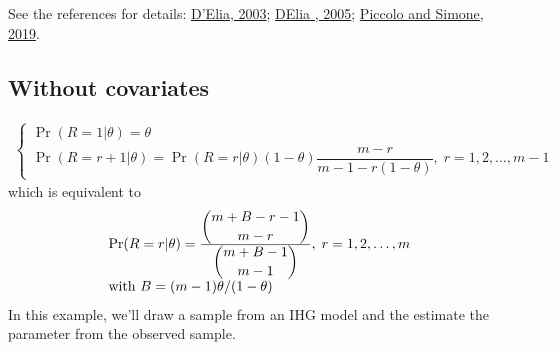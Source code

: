 \documentclass[letterpaper,10pt,english]{sphinxmanual}
\begin{document}
\sphinxAtStartPar
See the references for details: \hyperlink{cite.references:id17}{D’Elia, 2003}; \hyperlink{cite.references:id18}{D\textquotesingle{}Elia , 2005};
\hyperlink{cite.references:id3}{Piccolo and Simone, 2019}.


\subsection{Without covariates}
\label{\detokenize{manual:ihg-without-covariates}}\label{\detokenize{manual:id38}}
\sphinxAtStartPar
{}
\begin{equation*}
\begin{split}\left\{
\begin{array}{l}
    \Pr(R=1|\theta) = \theta
    \\
    \Pr(R=r+1|\theta) = \Pr(R=r|\theta)(1-\theta)\dfrac{m-r}{m-1-r(1-\theta)},\; r= 1,2, \ldots, m-1
\end{array}
\right.\end{split}
\end{equation*}
\sphinxAtStartPar
which is equivalent to
\begin{equation*}
\begin{split}\begin{array}{l}
\Pr(R=r|\theta) = \frac{ \dbinom{m+B-r-1}{m-r} }{ \dbinom{m+B-1}{m-1} },\; r= 1,2, \ldots, m
\\
\textrm{with } B = (m-1)\theta / (1 - \theta)
\end{array}\end{split}
\end{equation*}
\sphinxAtStartPar
In this example, we’ll draw a sample from an IHG model
and the estimate the parameter from the observed sample.
\end{document}
